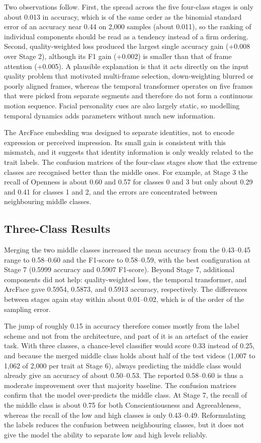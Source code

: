 \documentclass[10pt,a4paper,twocolumn]{article}
\begin{document}
Two observations follow. First, the spread across the five four-class stages is only about 0.013 in accuracy, which is of the same order as the binomial standard error of an accuracy near 0.44 on 2,000 samples (about 0.011), so the ranking of individual components should be read as a tendency instead of a firm ordering. Second, quality-weighted loss produced the largest single accuracy gain (+0.008 over Stage 2), although its F1 gain (+0.002) is smaller than that of frame attention (+0.005). A plausible explanation is that it acts directly on the input quality problem that motivated multi-frame selection, down-weighting blurred or poorly aligned frames, whereas the temporal transformer operates on five frames that were picked from separate segments and therefore do not form a continuous motion sequence. Facial personality cues are also largely static, so modelling temporal dynamics adds parameters without much new information.

The ArcFace embedding was designed to separate identities, not to encode expression or perceived impression. Its small gain is consistent with this mismatch, and it suggests that identity information is only weakly related to the trait labels. The confusion matrices of the four-class stages show that the extreme classes are recognised better than the middle ones. For example, at Stage 3 the recall of Openness is about 0.60 and 0.57 for classes 0 and 3 but only about 0.29 and 0.41 for classes 1 and 2, and the errors are concentrated between neighbouring middle classes.

\subsection{Three-Class Results}
Merging the two middle classes increased the mean accuracy from the 0.43--0.45 range to 0.58--0.60 and the F1-score to 0.58--0.59, with the best configuration at Stage 7 (0.5999 accuracy and 0.5907 F1-score). Beyond Stage 7, additional components did not help: quality-weighted loss, the temporal transformer, and ArcFace gave 0.5954, 0.5873, and 0.5913 accuracy, respectively. The differences between stages again stay within about 0.01--0.02, which is of the order of the sampling error.

The jump of roughly 0.15 in accuracy therefore comes mostly from the label scheme and not from the architecture, and part of it is an artefact of the easier task. With three classes, a chance-level classifier would score 0.33 instead of 0.25, and because the merged middle class holds about half of the test videos (1,007 to 1,062 of 2,000 per trait at Stage 6), always predicting the middle class would already give an accuracy of about 0.50--0.53. The reported 0.58--0.60 is thus a moderate improvement over that majority baseline. The confusion matrices confirm that the model over-predicts the middle class. At Stage 7, the recall of the middle class is about 0.75 for both Conscientiousness and Agreeableness, whereas the recall of the low and high classes is only 0.43--0.49. Reformulating the labels reduces the confusion between neighbouring classes, but it does not give the model the ability to separate low and high levels reliably.
\end{document}
